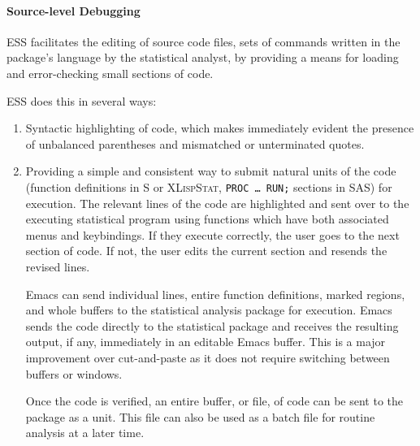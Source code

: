 \documentclass{article}
\newcommand*{\SAS}{\textsc{SAS}}
\newcommand*{\XLispStat}{\textsc{XLispStat}}
\newcommand{\stexttt}[1]{{\small\texttt{#1}}}
\begin{document}
\paragraph{Source-level Debugging}%
ESS facilitates the editing of source code files, sets of commands
written in the package's language by the statistical analyst, by
providing a means for loading and error-checking small sections of
code.  %

ESS does this in several ways:%
\begin{enumerate}
\item %
  Syntactic highlighting of code, which makes immediately evident the
  presence of unbalanced parentheses and mismatched or unterminated
  quotes.%

\item %
  Providing a simple and consistent way to submit natural units of the
  code (function definitions in S or \XLispStat, \stexttt{PROC \dots
    RUN;} sections in \SAS) for execution.  The relevant lines of the
  code are highlighted and sent over to the executing statistical
  program using functions which have both associated menus and keybindings.
  If they execute correctly, the user goes to the next
  section of code.  If not, the user edits the current section and
  resends the revised lines.
  
  Emacs can send individual lines, entire function definitions, marked
  regions, and whole buffers to the statistical analysis package for
  execution.  Emacs sends the code directly to the statistical package
  and receives the resulting output, if any, immediately in an
  editable Emacs buffer.  This is a major improvement over
  cut-and-paste as it does not require switching between buffers or
  windows.
  
  Once the code is verified, an entire buffer, or file, of code can be
  sent to the package as a unit.  This file can also be used as a
  batch file for routine analysis at a later time.


\end{enumerate}
\end{document}

